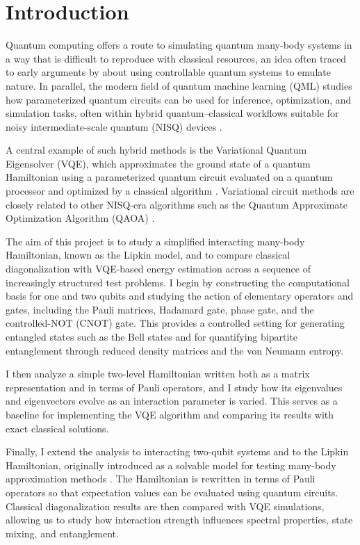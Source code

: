 \section{Introduction}\label{section:Introduction}

Quantum computing offers a route to simulating quantum many-body systems in a way that is difficult to reproduce with classical resources, an idea often traced to early arguments by \textcite{feynman1982simulating} about using controllable quantum systems to emulate nature. In parallel, the modern field of quantum machine learning (QML) studies how parameterized quantum circuits can be used for inference, optimization, and simulation tasks, often within hybrid quantum--classical workflows suitable for noisy intermediate-scale quantum (NISQ) devices \parencite{schuld2018supervised,schuld2021mlqc,conti2024qml,carleo2017nqs,carleo2019mlphys}. 

A central example of such hybrid methods is the Variational Quantum Eigensolver (VQE), which approximates the ground state of a quantum Hamiltonian using a parameterized quantum circuit evaluated on a quantum processor and optimized by a classical algorithm \parencite{peruzzo2014vqe,mcclean2016theory,tilly2022vqe_review}. Variational circuit methods are closely related to other NISQ-era algorithms such as the Quantum Approximate Optimization Algorithm (QAOA) \parencite{farhi2014qaoa,zhou2019qaoa}.

The aim of this project is to study a simplified interacting many-body Hamiltonian, known as the Lipkin model, and to compare classical diagonalization with VQE-based energy estimation across a sequence of increasingly structured test problems. I begin by constructing the computational basis for one and two qubits and studying the action of elementary operators and gates, including the Pauli matrices, Hadamard gate, phase gate, and the controlled-NOT (CNOT) gate. This provides a controlled setting for generating entangled states such as the Bell states and for quantifying bipartite entanglement through reduced density matrices and the von Neumann entropy.

I then analyze a simple two-level Hamiltonian written both as a matrix representation and in terms of Pauli operators, and I study how its eigenvalues and eigenvectors evolve as an interaction parameter is varied. This serves as a baseline for implementing the VQE algorithm and comparing its results with exact classical solutions.

Finally, I extend the analysis to interacting two-qubit systems and to the Lipkin Hamiltonian, originally introduced as a solvable model for testing many-body approximation methods \parencite{lipkin1965}. The Hamiltonian is rewritten in terms of Pauli operators so that expectation values can be evaluated using quantum circuits. Classical diagonalization results are then compared with VQE simulations, allowing us to study how interaction strength influences spectral properties, state mixing, and entanglement.

